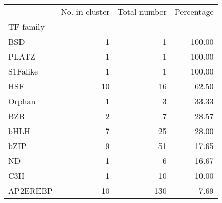 \begin{tabular}{lrrr}
\toprule
{} &  No. in cluster &  Total number &  Percentage \\
TF family &                 &               &             \\
\midrule
BSD       &               1 &             1 &      100.00 \\
PLATZ     &               1 &             1 &      100.00 \\
S1Falike  &               1 &             1 &      100.00 \\
HSF       &              10 &            16 &       62.50 \\
Orphan    &               1 &             3 &       33.33 \\
BZR       &               2 &             7 &       28.57 \\
bHLH      &               7 &            25 &       28.00 \\
bZIP      &               9 &            51 &       17.65 \\
ND        &               1 &             6 &       16.67 \\
C3H       &               1 &            10 &       10.00 \\
AP2EREBP  &              10 &           130 &        7.69 \\
\bottomrule
\end{tabular}
